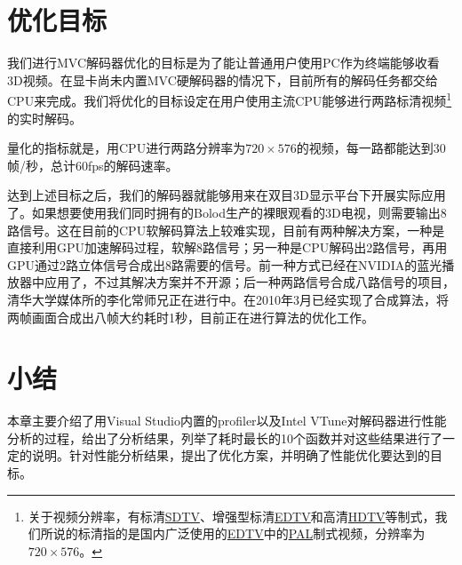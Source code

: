 \section{优化目标}
\label{sec:optaim}

我们进行MVC解码器优化的目标是为了能让普通用户使用PC作为终端能够收看3D视频。在显卡尚未内置MVC硬解码器的情况下，目前所有的解码任务都交给CPU来完成。我们将优化的目标设定在用户使用主流CPU能够进行两路标清视频\footnote{关于视频分辨率，有标清\href{http://en.wikipedia.org/wiki/Standard-definition_television}{SDTV}、增强型标清\href{http://en.wikipedia.org/wiki/Enhanced-definition_television}{EDTV}和高清\href{http://en.wikipedia.org/wiki/High-definition_television}{HDTV}等制式，我们所说的标清指的是国内广泛使用的\href{http://en.wikipedia.org/wiki/Enhanced-definition_television}{EDTV}中的\href{http://en.wikipedia.org/wiki/Phase_Alternating_Line}{PAL}制式视频，分辨率为$720\times576$。}的实时解码。

量化的指标就是，用CPU进行两路分辨率为$720\times576$的视频，每一路都能达到30帧/秒，总计60fps的解码速率。

达到上述目标之后，我们的解码器就能够用来在双目3D显示平台下开展实际应用了。如果想要使用我们同时拥有的Bolod生产的裸眼观看的3D电视，则需要输出8路信号。这在目前的CPU软解码算法上较难实现，目前有两种解决方案，一种是直接利用GPU加速解码过程，软解8路信号；另一种是CPU解码出2路信号，再用GPU通过2路立体信号合成出8路需要的信号。前一种方式已经在NVIDIA的蓝光播放器中应用了，不过其解决方案并不开源；后一种两路信号合成八路信号的项目，清华大学媒体所的李化常师兄正在进行中。在2010年3月已经实现了合成算法，将两帧画面合成出八帧大约耗时1秒，目前正在进行算法的优化工作。

\section{小结}
\label{sec:sum3}
本章主要介绍了用Visual Studio内置的profiler以及Intel VTune对解码器进行性能分析的过程，给出了分析结果，列举了耗时最长的10个函数并对这些结果进行了一定的说明。针对性能分析结果，提出了优化方案，并明确了性能优化要达到的目标。


